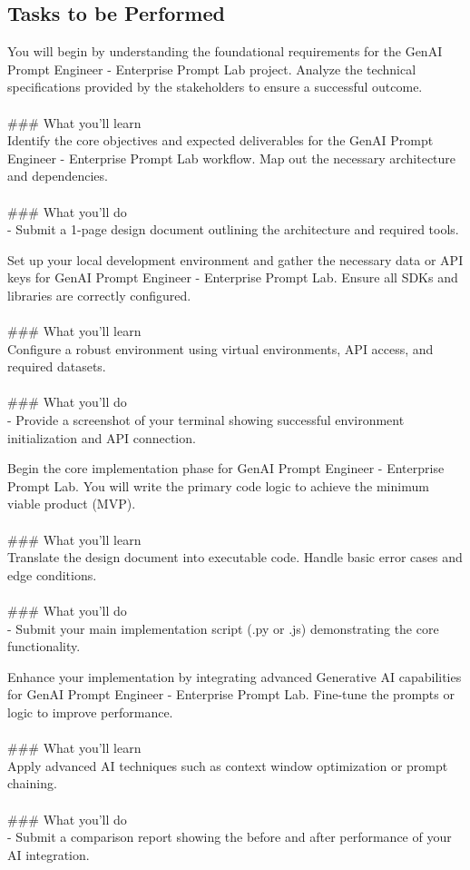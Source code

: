 \documentclass{article}
\begin{document}
\subsection*{Tasks to be Performed}
You will begin by understanding the foundational requirements for the GenAI Prompt Engineer - Enterprise Prompt Lab project. Analyze the technical specifications provided by the stakeholders to ensure a successful outcome. \\
 \\
### What you'll learn \\
Identify the core objectives and expected deliverables for the GenAI Prompt Engineer - Enterprise Prompt Lab workflow. Map out the necessary architecture and dependencies. \\
 \\
### What you'll do \\
- Submit a 1-page design document outlining the architecture and required tools.

Set up your local development environment and gather the necessary data or API keys for GenAI Prompt Engineer - Enterprise Prompt Lab. Ensure all SDKs and libraries are correctly configured. \\
 \\
### What you'll learn \\
Configure a robust environment using virtual environments, API access, and required datasets. \\
 \\
### What you'll do \\
- Provide a screenshot of your terminal showing successful environment initialization and API connection.

Begin the core implementation phase for GenAI Prompt Engineer - Enterprise Prompt Lab. You will write the primary code logic to achieve the minimum viable product (MVP). \\
 \\
### What you'll learn \\
Translate the design document into executable code. Handle basic error cases and edge conditions. \\
 \\
### What you'll do \\
- Submit your main implementation script (.py or .js) demonstrating the core functionality.

Enhance your implementation by integrating advanced Generative AI capabilities for GenAI Prompt Engineer - Enterprise Prompt Lab. Fine-tune the prompts or logic to improve performance. \\
 \\
### What you'll learn \\
Apply advanced AI techniques such as context window optimization or prompt chaining. \\
 \\
### What you'll do \\
- Submit a comparison report showing the before and after performance of your AI integration.
\end{document}
